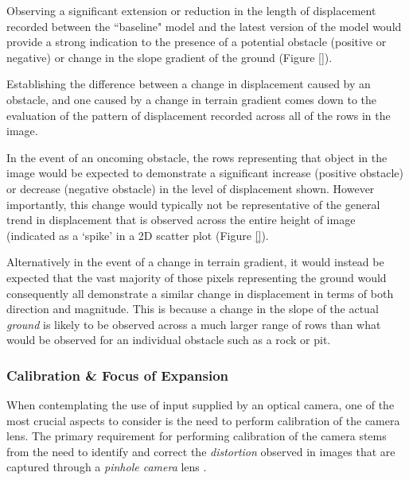 Observing a significant extension or reduction in the length of displacement recorded between the ``baseline" model and the latest version of the model would provide a strong indication to the presence of a potential obstacle (positive or negative) or change in the slope gradient of the ground (Figure \ref{}).

  
 Establishing the difference between a change in displacement caused by an obstacle, and one caused by a change in terrain gradient comes down to the evaluation of the pattern of displacement recorded across all of the rows in the image.
 
In the event of an oncoming obstacle, the rows representing that object in the image would be expected to demonstrate a significant increase (positive obstacle) or decrease (negative obstacle) in the level of displacement shown. However importantly, this change would typically not be representative of the general trend in displacement that is observed across the entire height of image (indicated as a `spike' in a 2D scatter plot (Figure \ref{}). 

 
 Alternatively in the event of a change in terrain gradient, it would instead be expected that the vast majority of those pixels representing the ground would consequently all demonstrate a similar change in displacement in terms of both direction and magnitude. This is because a change in the slope of the actual \textit{ground} is likely to be observed across a much larger range of rows than what would be observed for an individual obstacle such as a rock or pit.
 
\subsubsection{Calibration \& Focus of Expansion}
\label{hypo-calib}

When contemplating the use of input supplied by an optical camera, one of the most crucial aspects to consider is the need to perform calibration of the camera lens. The primary requirement for performing calibration of the camera stems from the need to identify and correct the \textit{distortion} observed in images that are captured through a \textit{pinhole camera} lens \cite{camera-calib}. 

